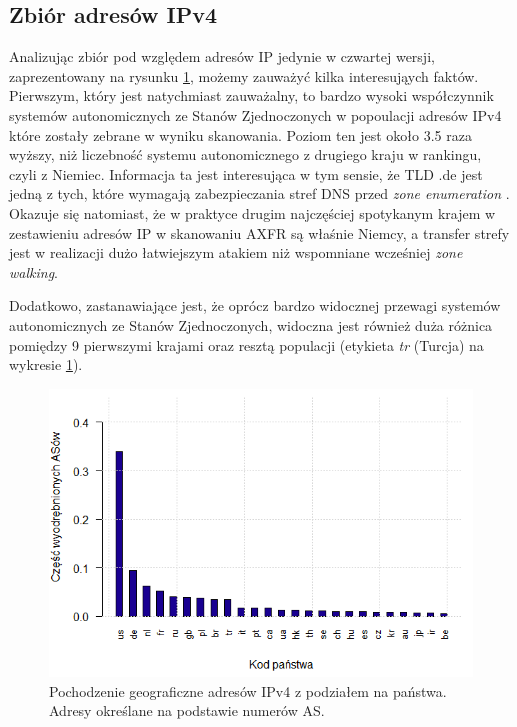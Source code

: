 \subsection{Zbiór adresów IPv4}
\label{sec:ipv4_results}
Analizując zbiór pod względem adresów IP jedynie w czwartej wersji, zaprezentowany na rysunku \ref{fig:ipv4_countries}, możemy
zauważyć kilka interesująych faktów. Pierwszym, który jest natychmiast zauważalny, to bardzo wysoki współczynnik systemów autonomicznych
ze Stanów Zjednoczonych w popoulacji adresów IPv4 które zostały zebrane w wyniku skanowania. Poziom ten jest około 3.5 raza wyższy,
niż liczebność systemu autonomicznego z drugiego kraju w rankingu, czyli z Niemiec. Informacja ta jest interesująca w tym sensie, że
TLD .de jest jedną z tych, które wymagają zabezpieczania stref DNS przed \textit{zone enumeration} \cite{euLaw, zoneEnumeration}.
Okazuje się natomiast,
że w praktyce drugim najczęściej spotykanym krajem w zestawieniu adresów IP w skanowaniu AXFR są właśnie Niemcy, a transfer strefy
jest w realizacji dużo łatwiejszym atakiem niż wspomniane wcześniej \textit{zone walking}.

Dodatkowo, zastanawiające jest, że oprócz bardzo widocznej przewagi systemów autonomicznych ze Stanów Zjednoczonych, widoczna jest
również duża różnica pomiędzy 9 pierwszymi krajami oraz resztą populacji (etykieta \textit{tr} (Turcja) na wykresie \ref{fig:ipv4_countries}).

\begin{figure}[ht]
	\centering
	\includegraphics[width=1.0\textwidth]{image/ipv4_as_countries_no_title}
	\caption{Pochodzenie geograficzne adresów IPv4 z podziałem na państwa. Adresy określane na podstawie numerów AS.}
	\label{fig:ipv4_countries}
\end{figure}

